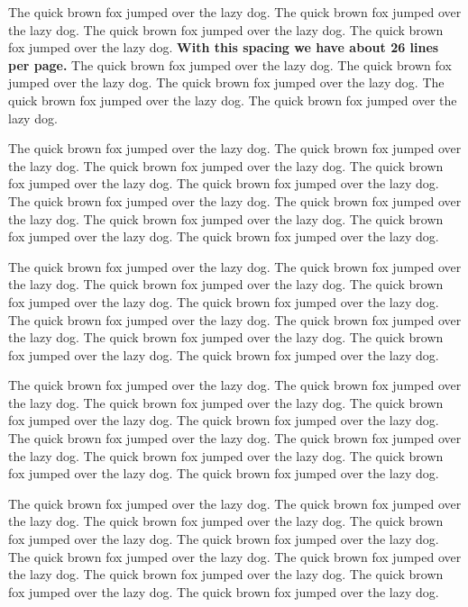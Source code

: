 \documentclass[
  12pt]{article}
\begin{document}
The quick brown fox jumped over the lazy dog. The quick brown fox jumped
over the lazy dog. The quick brown fox jumped over the lazy dog. The
quick brown fox jumped over the lazy dog. \textbf{With this spacing we
have about 26 lines per page.} The quick brown fox jumped over the lazy dog.
The quick brown fox jumped over the lazy dog. The quick brown fox jumped
over the lazy dog. The quick brown fox jumped over the lazy dog. The
quick brown fox jumped over the lazy dog.

The quick brown fox jumped over the lazy dog. The quick brown fox jumped
over the lazy dog. The quick brown fox jumped over the lazy dog. The
quick brown fox jumped over the lazy dog. The quick brown fox jumped
over the lazy dog. The quick brown fox jumped over the lazy dog. The
quick brown fox jumped over the lazy dog. The quick brown fox jumped
over the lazy dog. The quick brown fox jumped over the lazy dog. The
quick brown fox jumped over the lazy dog.

The quick brown fox jumped over the lazy dog. The quick brown fox jumped
over the lazy dog. The quick brown fox jumped over the lazy dog. The
quick brown fox jumped over the lazy dog. The quick brown fox jumped
over the lazy dog. The quick brown fox jumped over the lazy dog. The
quick brown fox jumped over the lazy dog. The quick brown fox jumped
over the lazy dog. The quick brown fox jumped over the lazy dog. The
quick brown fox jumped over the lazy dog.

The quick brown fox jumped over the lazy dog. The quick brown fox jumped
over the lazy dog. The quick brown fox jumped over the lazy dog. The
quick brown fox jumped over the lazy dog. The quick brown fox jumped
over the lazy dog. The quick brown fox jumped over the lazy dog. The
quick brown fox jumped over the lazy dog. The quick brown fox jumped
over the lazy dog. The quick brown fox jumped over the lazy dog. The
quick brown fox jumped over the lazy dog.

\addtolength{\textheight}{-.5in}%

\addtolength{\textheight}{.2in}%

The quick brown fox jumped over the lazy dog. The quick brown fox jumped
over the lazy dog. The quick brown fox jumped over the lazy dog. The
quick brown fox jumped over the lazy dog. The quick brown fox jumped
over the lazy dog. The quick brown fox jumped over the lazy dog. The
quick brown fox jumped over the lazy dog. The quick brown fox jumped
over the lazy dog. The quick brown fox jumped over the lazy dog. The
quick brown fox jumped over the lazy dog.
\end{document}
